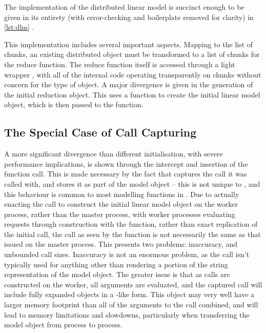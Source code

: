 The implementation of the distributed linear model is succinct enough to be given in its entirety (with error-checking and boilerplate removed for clarity) in \cref{lst:dlm} .


This implementation includes several important aspects.
Mapping to the list of chunks, an existing distributed object must be transformed to a list of chunks for the reduce function.
The reduce function itself is accessed through a light wrapper , with all of the internal code operating transparently on chunks without concern for the type of object.
A major divergence is given in the generation of the initial reduction object.
This uses a  function to create the initial  linear model object, which is then passed to the  function.

\subsection{The Special Case of Call Capturing}

A more significant divergence than different initialisation, with severe performance implications, is shown through the intercept and insertion of the function call.
This is made necessary by the fact that  captures the call it was called with, and stores it as part of the model object -- this is not unique to , and this behaviour is common to most modelling functions in \R{}.
Due to actually enacting the call to construct the initial  linear model object on the worker process, rather than the master process, with worker processes evaluating requests through construction with the  function, rather than exact replication of the initial call, the call as seen by the function is not necessarily the same as that issued on the master process.
This presents two problems: inaccuracy, and unbounded call sizes.
Inaccuracy is not an enormous problem, as the call isn't typically used for anything other than rendering a portion of the string representation of the model object.
The greater issue is that as calls are constructed on the worker, all arguments are evaluated, and the captured call will include fully expanded objects in a -like form.
This object may very well have a larger memory footprint than all of the arguments to the call combined, and will lead to memory limitations and slowdowns, particularly when transferring the model object from process to process.

